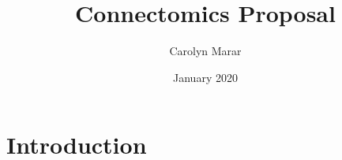 \documentclass{article}
\title{Connectomics Proposal}
\author{Carolyn Marar }
\date{January 2020}
\begin{document}
\maketitle

\section{Introduction}
\end{document}
